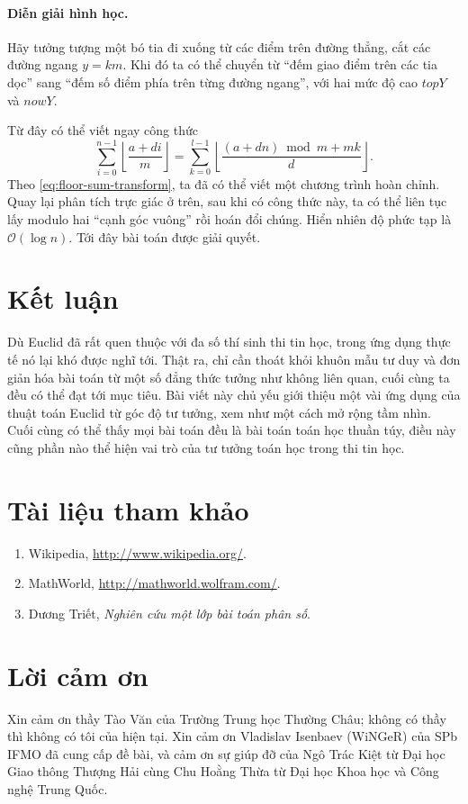 \documentclass[11pt]{article}
\newcommand{\Oh}{\mathcal{O}}
\newcommand{\floor}[1]{\left\lfloor #1\right\rfloor}
\begin{document}
\paragraph{Diễn giải hình học.}
Hãy tưởng tượng một bó tia đi xuống từ các điểm trên đường thẳng, cắt các
đường ngang $y=km$. Khi đó ta có thể chuyển từ ``đếm giao điểm trên các tia
dọc'' sang ``đếm số điểm phía trên từng đường ngang'', với hai mức độ cao
$\mathit{topY}$ và $\mathit{nowY}$.

Từ đây có thể viết ngay công thức
\begin{equation}
  \sum_{i=0}^{n-1}\floor{\frac{a+di}{m}}
  =
  \sum_{k=0}^{l-1}
  \floor{\frac{(a+dn)\bmod m+mk}{d}}.
  \label{eq:floor-sum-transform}
\end{equation}
Theo \eqref{eq:floor-sum-transform}, ta đã có thể viết một chương trình hoàn
chỉnh. Quay lại phân tích trực giác ở trên, sau khi có công thức này, ta có
thể liên tục lấy modulo hai ``cạnh góc vuông'' rồi hoán đổi chúng. Hiển nhiên
độ phức tạp là $\Oh(\log n)$. Tới đây bài toán được giải quyết.

\section{Kết luận}

Dù Euclid đã rất quen thuộc với đa số thí sinh thi tin học, trong ứng dụng
thực tế nó lại khó được nghĩ tới. Thật ra, chỉ cần thoát khỏi khuôn mẫu tư duy
và đơn giản hóa bài toán từ một số đẳng thức tưởng như không liên quan, cuối
cùng ta đều có thể đạt tới mục tiêu. Bài viết này chủ yếu giới thiệu một vài
ứng dụng của thuật toán Euclid từ góc độ tư tưởng, xem như một cách mở rộng
tầm nhìn. Cuối cùng có thể thấy mọi bài toán đều là bài toán toán học thuần
túy, điều này cũng phần nào thể hiện vai trò của tư tưởng toán học trong thi
tin học.

\section*{Tài liệu tham khảo}

\begin{enumerate}
  \item Wikipedia, \url{http://www.wikipedia.org/}.
  \item MathWorld, \url{http://mathworld.wolfram.com/}.
  \item Dương Triết, \textit{Nghiên cứu một lớp bài toán phân số}.
\end{enumerate}

\section*{Lời cảm ơn}

Xin cảm ơn thầy Tào Văn của Trường Trung học Thường Châu; không có thầy thì
không có tôi của hiện tại. Xin cảm ơn Vladislav Isenbaev (WiNGeR) của SPb
IFMO đã cung cấp đề bài, và cảm ơn sự giúp đỡ của Ngô Trác Kiệt từ Đại học
Giao thông Thượng Hải cùng Chu Hoằng Thừa từ Đại học Khoa học và Công nghệ
Trung Quốc.
\end{document}
